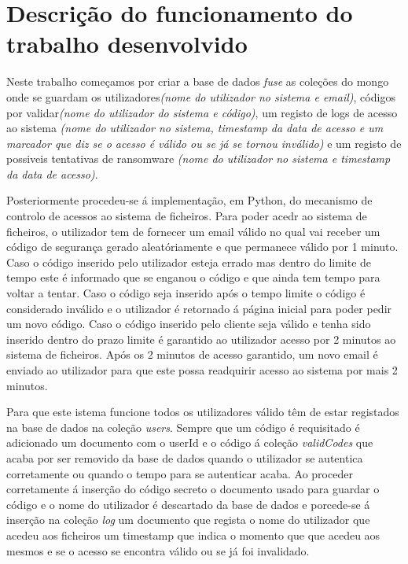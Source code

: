 
 
\section{Descrição do funcionamento do trabalho desenvolvido}

 \par Neste trabalho começamos por criar a base de dados \textit{fuse} as coleções do mongo onde se guardam os utilizadores\textit{(nome do utilizador no sistema e email)}, códigos por validar\textit{(nome do utilizador do sistema e código)}, um registo de logs de acesso ao sistema \textit{(nome do utilizador no sistema, timestamp da data de acesso e um marcador que diz se o acesso é válido ou se já se tornou inválido)} e um registo de possiveis tentativas de ransomware \textit{(nome do utilizador no sistema e timestamp da data de acesso)}.\newline
 \par Posteriormente procedeu-se á implementação, em Python, do mecanismo de controlo de acessos ao sistema de ficheiros. Para poder acedr ao sistema de ficheiros, o utilizador tem de fornecer um email válido no qual vai receber um código de segurança gerado aleatóriamente e que permanece válido por 1 minuto. Caso o código inserido pelo utilizador esteja errado mas dentro do limite de tempo este é informado que se enganou o código e que ainda tem tempo para voltar a tentar. Caso o código seja inserido após o tempo limite o código é considerado inválido e o utilizador é retornado á página inicial para poder pedir um novo código. Caso o código inserido pelo cliente seja válido e tenha sido inserido dentro do prazo limite é garantido ao utilizador acesso por 2 minutos ao sistema de ficheiros. Após os 2 minutos de acesso garantido, um novo email é enviado ao utilizador para que este possa readquirir acesso ao sistema por mais 2 minutos.\newline
 \par Para que este istema funcione todos os utilizadores válido têm de estar registados na base de dados na coleção \textit{users}. Sempre que um código é requisitado é adicionado um documento com o userId e o código á coleção \textit{validCodes} que acaba por ser removido da base de dados quando o utilizador se autentica corretamente ou quando o tempo para se autenticar acaba. Ao proceder corretamente á inserção do código secreto o documento usado para guardar o código  e  o nome do utilizador é descartado da base de dados e porcede-se á inserção na coleção \textit{log} um documento que regista o nome do utilizador que acedeu aos ficheiros um timestamp que indica o momento que que acedeu aos mesmos e se o acesso se encontra válido ou se já foi invalidado.\newline
